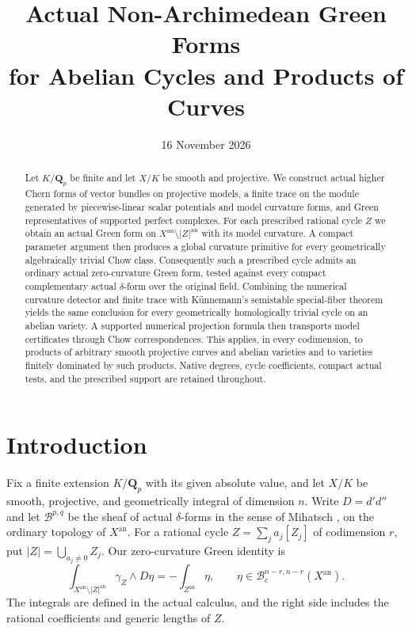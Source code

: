 \documentclass[11pt,reqno]{amsart}
\title[Actual Green forms and Chow correspondences]{Actual Non-Archimedean Green Forms\\ for Abelian Cycles and Products of Curves}
\author{}
\date{16 November 2026}
\theoremstyle{definition}
\theoremstyle{remark}
\numberwithin{equation}{section}
\newcommand{\an}{\mathrm{an}}
\newcommand{\B}{\mathcal B}
\begin{document}
\begin{abstract}
Let $K/\mathbf Q_p$ be finite and let $X/K$ be smooth and
projective.  We construct actual higher Chern forms of vector bundles
on projective models, a finite trace on the module generated by
piecewise-linear scalar potentials and model curvature forms, and
Green representatives of supported perfect complexes.  For each
prescribed rational cycle $Z$ we obtain an actual Green form on
$X^{\an}\setminus |Z|^{\an}$ with its model curvature.  A compact
parameter argument then produces a global curvature primitive for
every geometrically algebraically trivial Chow class.  Consequently
such a prescribed cycle admits an ordinary actual zero-curvature
Green form, tested against every compact complementary actual
$\delta$-form over the original field.  Combining the numerical
curvature detector and finite trace with K\"unnemann's semistable
special-fiber theorem yields the same conclusion for every
geometrically homologically trivial cycle on an abelian variety.
A supported numerical projection formula then transports model
certificates through Chow correspondences.  This applies, in every
codimension, to products of arbitrary smooth projective curves and
abelian varieties and to varieties finitely dominated by such
products.  Native degrees, cycle coefficients, compact actual
tests, and the prescribed support are retained throughout.
\end{abstract}
\maketitle
\tableofcontents

\section{Introduction}\label{sec:introduction}

Fix a finite extension $K/\mathbf Q_p$ with its given absolute value,
and let $X/K$ be smooth, projective, and geometrically integral
of dimension $n$.  Write $D=d'd''$ and let
$\B^{p,q}$ be the sheaf of actual $\delta$-forms in the sense
of Mihatsch \cite{M}, on the ordinary topology of $X^{\an}$.
For a rational cycle $Z=\sum_j a_j[Z_j]$ of codimension $r$,
put $|Z|=\bigcup_{a_j\ne0} Z_j$.
Our zero-curvature Green identity is
\begin{equation}\label{eq:main-green}
\int_{X^{\an}\setminus|Z|^{\an}}\gamma_Z\wedge D\eta
=-\int_{Z^{\an}}\eta,
\qquad
\eta\in\B_c^{n-r,n-r}(X^{\an}).
\end{equation}
The integrals are defined in the actual calculus, and the right
side includes the rational coefficients and generic lengths of $Z$.
\end{document}
